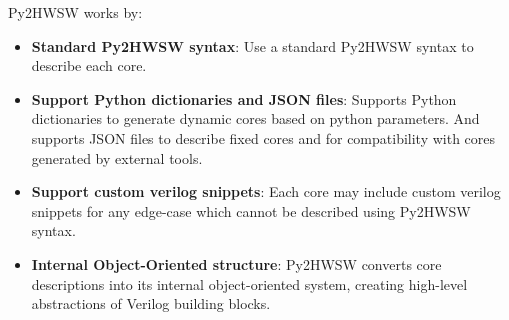 %

Py2HWSW works by:
\begin{itemize}
    \item \textbf{Standard Py2HWSW syntax}: Use a standard Py2HWSW
      syntax to describe each core.
    \item \textbf{Support Python dictionaries and JSON files}: Supports Python
      dictionaries to generate dynamic cores based on python parameters. And
      supports JSON files to describe fixed cores and for compatibility with cores
      generated by external tools.
    \item \textbf{Support custom verilog snippets}: Each core may include custom
      verilog snippets for any edge-case which cannot be described using Py2HWSW
      syntax.
    \item \textbf{Internal Object-Oriented structure}: Py2HWSW converts core
      descriptions into its internal object-oriented system, creating high-level
      abstractions of Verilog building blocks.
\end{itemize}
